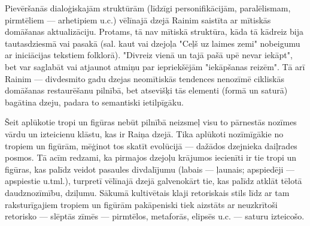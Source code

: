 \documentclass[11pt]{article}
\begin{document}
{Pievēršanās dialoģiskajām struktūrām (līdzīgi
personifikācijām, paralēlismam, pirmtēliem ---
arhetipiem u.c.) vēlīnajā dzejā Rainim saistīta
ar mītiskās domāšanas aktualizāciju. Protams,
tā nav mītiskā struktūra, kāda tā kādreiz bija
tautasdziesmā vai pasakā (sal. kaut vai dzejoļa
"Ceļš uz laimes zemi" nobeigumu ar iniciācijas
tekstiem folklorā). "Divreiz vienā un tajā pašā
upē nevar iekāpt", bet var saglabāt vai atjaunot
atmiņu par iepriekšējām "iekāpšanas reizēm".
Tā arī Rainim --- divdesmito gadu dzejas neomītiskās
tendences nenozīmē cikliskās domāšanas restaurēšanu
pilnībā, bet atsevišķi tās elementi (formā un
saturā) bagātina dzeju, padara to semantiski
ietilpīgāku.
}

Šeit aplūkotie tropi un figūras nebūt pilnībā
neizsmeļ visu to pārnestās nozīmes vārdu un
izteicienu klāstu, kas ir Raiņa dzejā. Tika
aplūkoti nozīmīgākie no tropiem un figūrām,
mēģinot tos skatīt evolūcijā --- dažādos
dzejnieka daiļrades posmos. Tā acīm redzami,
ka pirmajos dzejoļu krājumos iecienīti
ir tie tropi un figūras, kas palīdz veidot pasaules
divdalījumu (labais --- ļaunais; apspiedēji ---
apspiestie u.tml.), turpretī vēlīnajā dzejā
galvenokārt tie, kas palīdz atklāt
tēlotā daudznozīmību, dziļumu. Sākumā kultivētais
klaji retoriskais stils līdz ar tam raksturīgajiem
tropiem un figūrām pakāpeniski tiek aizstāts ar
neuzkrītoši retorisko --- slēptās zīmēs ---
pirmtēlos, metaforās, elipsēs u.c. --- saturu
izteicošo.
\end{document}

